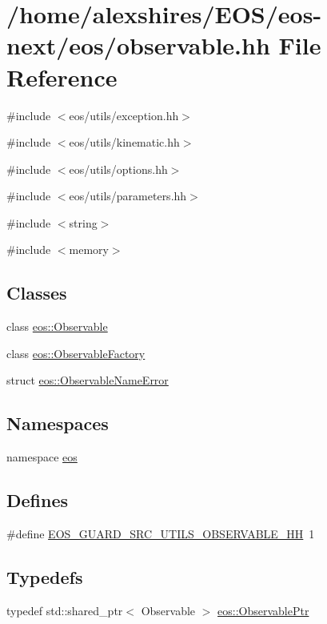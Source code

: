 \hypertarget{observable_8hh}{
\section{/home/alexshires/EOS/eos-\/next/eos/observable.hh File Reference}
\label{observable_8hh}
}
{\ttfamily \#include $<$eos/utils/exception.hh$>$}\par
{\ttfamily \#include $<$eos/utils/kinematic.hh$>$}\par
{\ttfamily \#include $<$eos/utils/options.hh$>$}\par
{\ttfamily \#include $<$eos/utils/parameters.hh$>$}\par
{\ttfamily \#include $<$string$>$}\par
{\ttfamily \#include $<$memory$>$}\par
\subsection*{Classes}
\begin{DoxyCompactItemize}
\item 
class \hyperlink{classeos_1_1Observable}{eos::Observable}
\item 
class \hyperlink{classeos_1_1ObservableFactory}{eos::ObservableFactory}
\item 
struct \hyperlink{structeos_1_1ObservableNameError}{eos::ObservableNameError}
\end{DoxyCompactItemize}
\subsection*{Namespaces}
\begin{DoxyCompactItemize}
\item 
namespace \hyperlink{namespaceeos}{eos}
\end{DoxyCompactItemize}
\subsection*{Defines}
\begin{DoxyCompactItemize}
\item 
\#define \hyperlink{observable_8hh_ac8ede094dc6ddf4b3b10feb4fef33910}{EOS\_\-GUARD\_\-SRC\_\-UTILS\_\-OBSERVABLE\_\-HH}~1
\end{DoxyCompactItemize}
\subsection*{Typedefs}
\begin{DoxyCompactItemize}
\item 
typedef std::shared\_\-ptr$<$ Observable $>$ \hyperlink{namespaceeos_a470e5dd806bd129080f1aa0c2954646f}{eos::ObservablePtr}
\end{DoxyCompactItemize}


